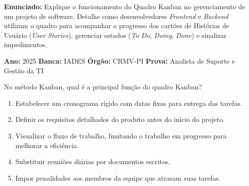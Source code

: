 \documentclass[12pt]{article}
\begin{document}
\vspace{0.15cm}
\noindent\textbf{Enunciado:} Explique o funcionamento do Quadro Kanban no gerenciamento de um projeto de software. Detalhe como desenvolvedores \textit{Frontend} e \textit{Backend} utilizam o quadro para acompanhar o progresso dos cartões de Histórias de Usuário (\textit{User Stories}), gerenciar estados (\textit{To Do}, \textit{Doing}, \textit{Done}) e sinalizar impedimentos.

\vspace{0.2cm}
\begin{caixaResposta}
\end{caixaResposta}

\vspace{0.6cm}

\vspace{0.15cm}

\begin{metaConcurso}
\small \textbf{Ano:} 2025 \qquad \textbf{Banca:} IADES \qquad \textbf{Órgão:} CRMV-PI \qquad \textbf{Prova:} Analista de Suporte e Gestão da TI
\end{metaConcurso}

\vspace{0.15cm}
\noindent No método Kanban, qual é a principal função do quadro Kanban?

\begin{enumerate}[label=\Alph*)]
    \item Estabelecer um cronograma rígido com datas fixas para entrega das tarefas.
    \item Definir os requisitos detalhados do produto antes do início do projeto.
    \item Visualizar o fluxo de trabalho, limitando o trabalho em progresso para melhorar a eficiência.
    \item Substituir reuniões diárias por documentos escritos.
    \item Impor penalidades aos membros da equipe que atrasam suas tarefas.
\end{enumerate}

\vspace{0.6cm}

\vspace{0.15cm}
\end{document}
